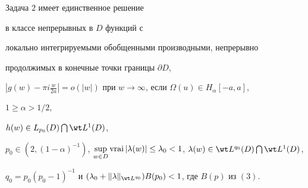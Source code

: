 \begin{thm}


Задача $2$ имеет единственное решение


в классе непрерывных в $D$ функций с


локально интегрируемыми обобщенными производными, непрерывно


продолжимых в конечные точки границы $\partial D$,


$|g(w) - \pi i\frac{w}{2a}| =


o(|w|)$ при $w \to \infty$, если $\Omega(u) \in H_{\alpha}[-a, a]$,


$1 \geq \alpha > 1/2$,


$h(w) \in L_{p_0}(D) \bigcap \wt L^1 (D)$,


$p_0 \in (2, (1 - \alpha)^{-1})$, $\sup\limits_{w \in D} \vrai


|\lambda(w)| \leq \lambda_0 < 1$, $\lambda(w) \in \wt L^{q_0}(D) \bigcap


\wt L^1 (D)$,


$q_0 = p_0(p_0 - 1)^{-1}$ и $(\lambda_0 +


\|\lambda\|_{\wt L^{q_0}}) B(p_0) < 1$, где $B( p )$ из $(3)$.


\end{thm}





